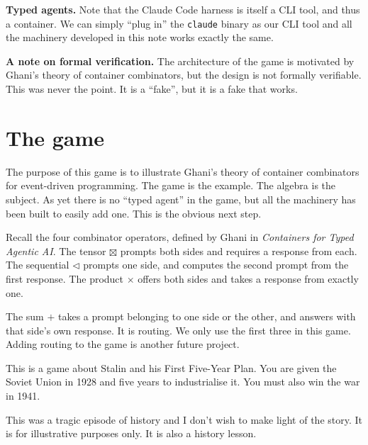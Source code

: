 \documentclass[11pt,a4paper]{article}
\begin{document}
\begin{orestisbox}
\textbf{Typed agents.} Note that the Claude Code harness is itself a CLI tool, and thus a
container. We can
simply ``plug in'' the \texttt{claude} binary as our CLI tool and all the machinery developed in
this note works exactly the same.
\end{orestisbox}

\begin{pinkbox}
\textbf{A note on formal verification.} The architecture of the game is motivated by Ghani's theory
of container combinators, but the design is not formally verifiable. This was never the point. It
is a ``fake'', but it is a fake that works.
\end{pinkbox}

\newpage

\tableofcontents

\newpage

\section{The game}
\label{sec:game}

The purpose of this game is to illustrate Ghani's theory of container combinators for
event-driven programming. The game is the example. The algebra is the subject. As yet there is no
``typed agent'' in the game, but all the machinery has been built to easily add one. This is the
obvious next step.

Recall the four combinator operators, defined by Ghani in \emph{Containers for Typed Agentic AI}.
The tensor $\boxtimes$ prompts both sides
and requires a response from each. The sequential $\lhd$ prompts one side, and computes the second
prompt from the first response. The product $\times$ offers both sides and takes a response from
exactly one.

The sum $+$ takes a prompt belonging to one side or the other, and answers with that side's own
response. It is routing. We only use the first three in this game. Adding routing to the game is
another future project.

\begin{sectionbox}
This is a game about Stalin and his First Five-Year Plan. You are given the Soviet Union in 1928
and five years to industrialise it. You must also win the war in 1941.

This was a tragic episode of history and I don't wish to make light of the story. It is for
illustrative purposes only. It is also a history lesson.
\end{sectionbox}
\end{document}
